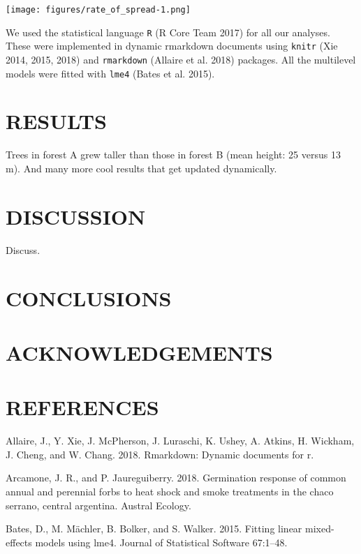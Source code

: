\documentclass[11pt,a4paper]{article}
\begin{document}
\texttt{[image: figures/rate\_of\_spread-1.png]}

We used the statistical language \texttt{R} (R Core Team 2017) for all
our analyses. These were implemented in dynamic rmarkdown documents
using \texttt{knitr} (Xie 2014, 2015, 2018) and \texttt{rmarkdown}
(Allaire et al. 2018) packages. All the multilevel models were fitted
with \texttt{lme4} (Bates et al. 2015).

\hypertarget{results}{%
\section{RESULTS}\label{results}}

Trees in forest A grew taller than those in forest B (mean height: 25
versus 13 m). And many more cool results that get updated dynamically.

\hypertarget{discussion}{%
\section{DISCUSSION}\label{discussion}}

Discuss.

\hypertarget{conclusions}{%
\section{CONCLUSIONS}\label{conclusions}}

\hypertarget{acknowledgements}{%
\section{ACKNOWLEDGEMENTS}\label{acknowledgements}}

\hypertarget{references}{%
\section{REFERENCES}\label{references}}

\hypertarget{refs}{}
\leavevmode\hypertarget{ref-Allaire_2018}{}%
Allaire, J., Y. Xie, J. McPherson, J. Luraschi, K. Ushey, A. Atkins, H.
Wickham, J. Cheng, and W. Chang. 2018. Rmarkdown: Dynamic documents for
r.

\leavevmode\hypertarget{ref-Arcamone_2018}{}%
Arcamone, J. R., and P. Jaureguiberry. 2018. Germination response of
common annual and perennial forbs to heat shock and smoke treatments in
the chaco serrano, central argentina. Austral Ecology.

\leavevmode\hypertarget{ref-Bates_2015}{}%
Bates, D., M. Mächler, B. Bolker, and S. Walker. 2015. Fitting linear
mixed-effects models using lme4. Journal of Statistical Software
67:1--48.
\end{document}
